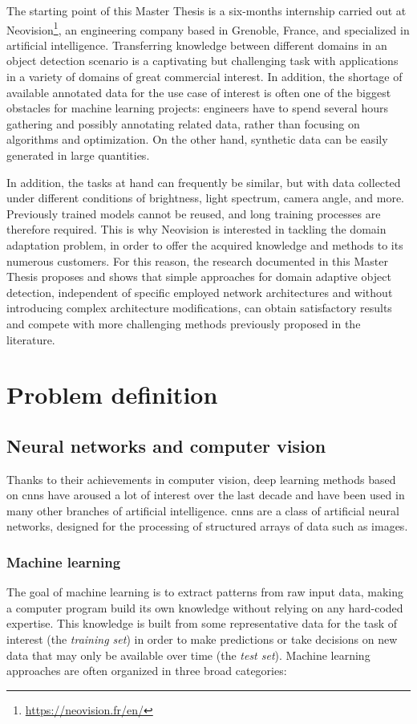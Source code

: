 \documentclass[%
    corpo=12pt,
    twoside,
    stile=classica,   
    tipotesi=magistrale,
    evenboxes,
    english,
	numerazioneromana,
]{toptesi}
\begin{document}
\bigskip
The starting point of this Master Thesis is a six-months internship carried out at Neovision\footnote{\url{https://neovision.fr/en/}}, an engineering company based in Grenoble, France, and specialized in artificial intelligence. Transferring knowledge between different domains in an object detection scenario is a captivating but challenging task with applications in a variety of domains of great commercial interest. In addition, the shortage of available annotated data for the use case of interest is often one of the biggest obstacles for machine learning projects: engineers have to spend several hours gathering and possibly annotating related data, rather than focusing on algorithms and optimization. On the other hand, synthetic data can be easily generated in large quantities.

In addition, the tasks at hand can frequently be similar, but with data collected under different conditions of brightness, light spectrum, camera angle, and more. Previously trained models cannot be reused, and long training processes are therefore required. This is why Neovision is interested in tackling the domain adaptation problem, in order to offer the acquired knowledge and methods to its numerous customers. For this reason, the research documented in this Master Thesis proposes and shows that simple approaches for domain adaptive object detection, independent of specific employed network architectures and without introducing complex architecture modifications, can obtain satisfactory results and compete with more challenging methods previously proposed in the literature.


\chapter{Problem definition}
\section{Neural networks and computer vision}
Thanks to their achievements in computer vision, deep learning methods based on \glspl{cnn} have aroused a lot of interest over the last decade and have been used in many other branches of artificial intelligence. \Glspl{cnn} are a class of artificial neural networks, designed for the processing of structured arrays of data such as images.

\subsection{Machine learning}
The goal of machine learning is to extract patterns from raw input data, making a computer program build its own knowledge without relying on any hard-coded expertise. This knowledge is built from some representative data for the task of interest (the \textit{training set}) in order to make predictions or take decisions on new data that may only be available over time (the \textit{test set}). Machine learning approaches are often organized in three broad categories:
\end{document}
